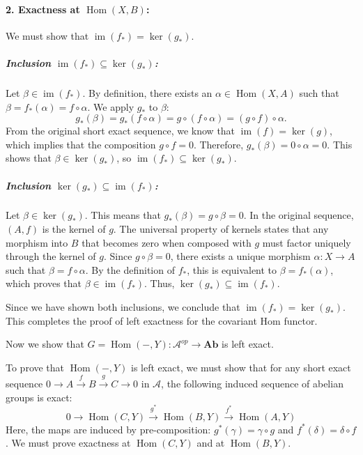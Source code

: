 \documentclass[11pt]{article}
\theoremstyle{definition}
\begin{document}
\paragraph{2. Exactness at $\operatorname{Hom}(X, B)$:} We must show that $\operatorname{im}(f_*) = \ker(g_*)$.

\subparagraph{Inclusion $\operatorname{im}(f_*) \subseteq \ker(g_*)$:}
Let $\beta \in \operatorname{im}(f_*)$. By definition, there exists an $\alpha \in \operatorname{Hom}(X, A)$ such that $\beta = f_*(\alpha) = f \circ \alpha$. We apply $g_*$ to $\beta$:
\[
g_*(\beta) = g_*(f \circ \alpha) = g \circ (f \circ \alpha) = (g \circ f) \circ \alpha.
\]
From the original short exact sequence, we know that $\operatorname{im}(f) = \ker(g)$, which implies that the composition $g \circ f = 0$. Therefore, $g_*(\beta) = 0 \circ \alpha = 0$. This shows that $\beta \in \ker(g_*)$, so $\operatorname{im}(f_*) \subseteq \ker(g_*)$.

\subparagraph{Inclusion $\ker(g_*) \subseteq \operatorname{im}(f_*)$:}
Let $\beta \in \ker(g_*)$. This means that $g_*(\beta) = g \circ \beta = 0$. In the original sequence, $(A, f)$ is the kernel of $g$. The universal property of kernels states that any morphism into $B$ that becomes zero when composed with $g$ must factor uniquely through the kernel of $g$.
Since $g \circ \beta = 0$, there exists a unique morphism $\alpha: X \to A$ such that $\beta = f \circ \alpha$. By the definition of $f_*$, this is equivalent to $\beta = f_*(\alpha)$, which proves that $\beta \in \operatorname{im}(f_*)$. Thus, $\ker(g_*) \subseteq \operatorname{im}(f_*)$.

Since we have shown both inclusions, we conclude that $\operatorname{im}(f_*) = \ker(g_*)$. This completes the proof of left exactness for the covariant Hom functor.


Now we show that
 $G = \operatorname{Hom}(-, Y): \mathcal{A}^{op} \to \mathbf{Ab}$ is left exact.



To prove that $\operatorname{Hom}(-, Y)$ is left exact, we must show that for any short exact sequence $0 \to A \xrightarrow{f} B \xrightarrow{g} C \to 0$ in $\mathcal{A}$, the following induced sequence of abelian groups is exact:
\[
0 \to \operatorname{Hom}(C, Y) \xrightarrow{g^*} \operatorname{Hom}(B, Y) \xrightarrow{f^*} \operatorname{Hom}(A, Y)
\]
Here, the maps are induced by pre-composition: $g^*(\gamma) = \gamma \circ g$ and $f^*(\delta) = \delta \circ f$. We must prove exactness at $\operatorname{Hom}(C, Y)$ and at $\operatorname{Hom}(B, Y)$.
\end{document}
